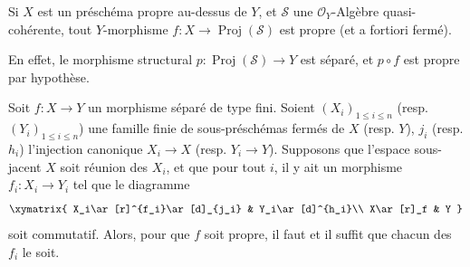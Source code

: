 \begin{corollary}[5.4.4]
\label{II.5.4.4-fr}
Si $X$ est un préschéma propre au-dessus de $Y$, et $\mathcal{S}$ une
$\mathcal{O}_Y$-Algèbre quasi-cohérente, tout $Y$-morphisme
$f:X\to\operatorname{Proj}(\mathcal{S})$ est propre (et a fortiori fermé).
\end{corollary}

En effet, le morphisme structural
$p:\operatorname{Proj}(\mathcal{S})\to Y$ est séparé, et $p\circ f$ est
propre par hypothèse.

\begin{corollary}[5.4.5]
\label{II.5.4.5-fr}
Soit $f:X\to Y$ un morphisme séparé de type fini. Soient
$(X_i)_{1\leq i\leq n}$ (resp. $(Y_i)_{1\leq i\leq n}$) une famille finie
de sous-préschémas fermés de $X$ (resp. $Y$), $j_i$ (resp. $h_i$)
l'injection canonique $X_i\to X$ (resp. $Y_i\to Y$). Supposons que l'espace
sous-jacent $X$ soit réunion des $X_i$, et que pour tout $i$, il y ait un
morphisme $f_i:X_i\to Y_i$ tel que le diagramme
\[
  \xymatrix{
    X_i\ar[r]^{f_i}\ar[d]_{j_i} & Y_i\ar[d]^{h_i}\\
    X\ar[r]_f & Y
  }
\]
soit commutatif. Alors, pour que $f$ soit propre, il faut et il suffit que
chacun des $f_i$ le soit.
\end{corollary}


